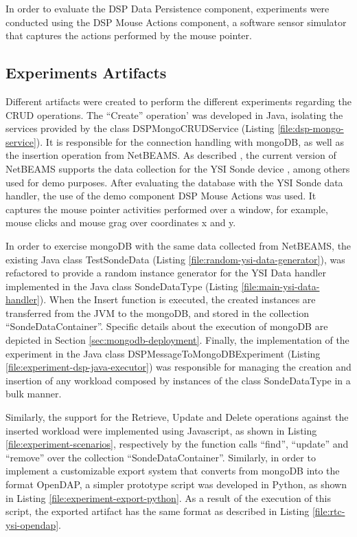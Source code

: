 In order to evaluate the DSP Data Persistence component, experiments were
conducted using the DSP Mouse Actions component, a software sensor simulator
that captures the actions performed by the mouse pointer.

\subsection{Experiments Artifacts}

Different artifacts were created to perform the different experiments regarding
the CRUD operations. The ``Create'' operation' was developed in Java, isolating
the services provided by the class DSPMongoCRUDService (Listing
\ref{file:dsp-mongo-service}). It is responsible for the connection handling
with mongoDB, as well as the insertion operation from NetBEAMS. As described
\cite{netbeams-dsp-architecture}, the current version of NetBEAMS supports the
data collection for the YSI Sonde device \cite{YSI-Sonde}, among others used
for demo purposes. After evaluating the database with the YSI Sonde data
handler, the use of the demo component DSP Mouse Actions was used. It captures
the mouse pointer activities performed over a window, for example, mouse clicks
and mouse grag over coordinates x and y.

In order to exercise mongoDB with the same data collected from NetBEAMS, the
existing Java class TestSondeData (Listing
\ref{file:random-ysi-data-generator}), was refactored to provide a random
instance generator for the YSI Data handler implemented in the Java class
SondeDataType (Listing \ref{file:main-ysi-data-handler}). When the Insert
function is executed, the created instances are transferred from the JVM to
the mongoDB, and stored in the collection ``SondeDataContainer''. Specific
details about the execution of mongoDB are depicted in Section
\ref{sec:mongodb-deployment}. Finally, the implementation of the experiment
in the Java class DSPMessageToMongoDBExperiment (Listing
\ref{file:experiment-dsp-java-executor}) was responsible for managing the
creation and insertion of any workload composed by instances of the class
SondeDataType in a bulk manner.

Similarly, the support for the Retrieve, Update and Delete operations against
the inserted workload were implemented using Javascript, as shown in Listing
\ref{file:experiment-scenarios}, respectively by the function calls ``find'',
``update'' and ``remove'' over the collection ``SondeDataContainer''.
Similarly, in order to implement a customizable export system that converts
from mongoDB into the format OpenDAP, a simpler prototype script was developed
in Python, as shown in Listing \ref{file:experiment-export-python}. As a result
of the execution of this script, the exported artifact has the same format as
described in Listing \ref{file:rtc-ysi-opendap}. 

